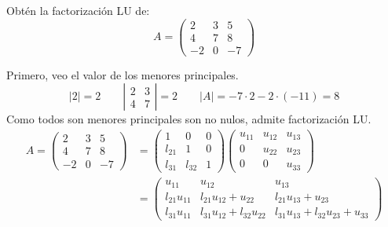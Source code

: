 \begin{ejercicio*}
    Obtén la factorización LU de:
    \begin{equation*} A = \left(
        \begin{array}{ccc}
            2 & 3 & 5 \\
            4 & 7 & 8 \\
            -2 & 0 & -7
        \end{array}\right)
    \end{equation*}

    Primero, veo el valor de los menores principales.
    \begin{equation*}
        |2|=2 \qquad
        \left| \begin{array}{cc}
            2 & 3 \\
            4 & 7
        \end{array} \right| = 2 \qquad
        |A|=-7\cdot 2 -2\cdot (-11) = 8
    \end{equation*}
    Como todos son menores principales son no nulos, admite factorización LU.
    \begin{equation*}\begin{split} A = \left(
        \begin{array}{ccc}
            2 & 3 & 5 \\
            4 & 7 & 8 \\
            -2 & 0 & -7
        \end{array}\right) & 
        = \left(
        \begin{array}{ccc}
            1 & 0 & 0 \\
            l_{21} & 1 & 0 \\
            l_{31} & l_{32} & 1
        \end{array}\right) \left(
        \begin{array}{ccc}
            u_{11} & u_{12} & u_{13} \\
            0 & u_{22} & u_{23} \\
            0 & 0 & u_{33}
        \end{array}\right) \\ &
        = \left(
        \begin{array}{ccc}
            u_{11} & u_{12} & u_{13} \\
            l_{21}u_{11} & l_{21}u_{12}+u_{22} & l_{21}u_{13}+u_{23} \\
            l_{31}u_{11} & l_{31}u_{12} + l_{32}u_{22} & l_{31}u_{13}+l_{32}u_{23} + u_{33}
        \end{array}\right)
    \end{split}\end{equation*}
    

\end{ejercicio*}
